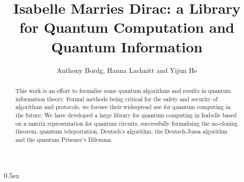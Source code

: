 \documentclass[11pt,a4paper]{article}
\begin{document}
\title{Isabelle Marries Dirac: a Library for Quantum Computation and Quantum Information}
\author{Anthony Bordg, Hanna Lachnitt and Yijun He}
\maketitle

\tableofcontents

\begin{abstract}
This work is an effort to formalise some quantum algorithms and results in quantum information theory. Formal methods being critical for the safety and security of algorithms and protocols, we foresee their widespread use for quantum computing in the future. We have developed a large library for quantum computing in Isabelle based on a matrix representation for quantum circuits, successfully formalising the no-cloning theorem, quantum teleportation, Deutsch's algorithm, the Deutsch-Jozsa algorithm and the quantum Prisoner's Dilemma.
\end{abstract}


\parindent 0pt\parskip 0.5ex



\nocite{*}


\end{document}
